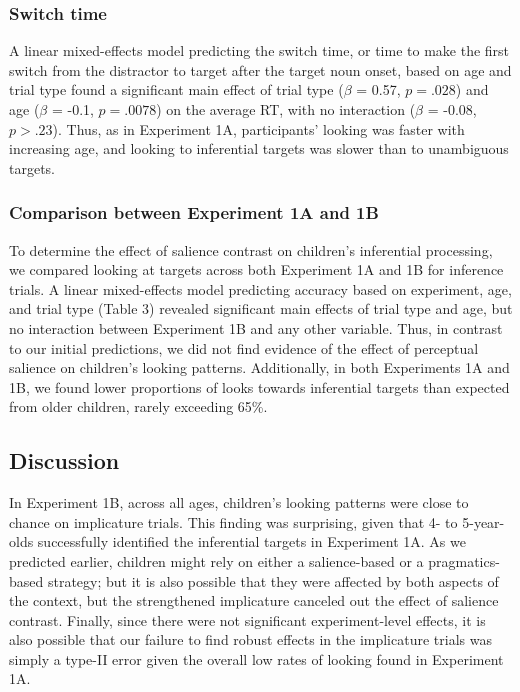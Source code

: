 \documentclass{rsos}
\begin{document}
\subsubsection{Switch time}\label{switch-time-1}

A linear mixed-effects model predicting the switch time, or time to make
the first switch from the distractor to target after the target noun
onset, based on age and trial type found a significant main effect of
trial type (\(\beta\) = 0.57, \(p =.028\)) and age (\(\beta\) = -0.1,
\(p =.0078\)) on the average RT, with no interaction (\(\beta\) = -0.08,
\(p >.23\)). Thus, as in Experiment 1A, participants' looking was faster
with increasing age, and looking to inferential targets was slower than
to unambiguous targets.

\subsubsection{Comparison between Experiment 1A and
1B}\label{comparison-between-experiment-1a-and-1b}

To determine the effect of salience contrast on children's inferential
processing, we compared looking at targets across both Experiment 1A and
1B for inference trials. A linear mixed-effects model predicting
accuracy based on experiment, age, and trial type (Table 3) revealed
significant main effects of trial type and age, but no interaction
between Experiment 1B and any other variable. Thus, in contrast to our
initial predictions, we did not find evidence of the effect of
perceptual salience on children's looking patterns. Additionally, in
both Experiments 1A and 1B, we found lower proportions of looks towards
inferential targets than expected from older children, rarely exceeding
65\%.

\subsection{Discussion}\label{discussion-1}

In Experiment 1B, across all ages, children's looking patterns were
close to chance on implicature trials. This finding was surprising,
given that 4- to 5-year-olds successfully identified the inferential
targets in Experiment 1A. As we predicted earlier, children might rely
on either a salience-based or a pragmatics-based strategy; but it is
also possible that they were affected by both aspects of the context,
but the strengthened implicature canceled out the effect of salience
contrast. Finally, since there were not significant experiment-level
effects, it is also possible that our failure to find robust effects in
the implicature trials was simply a type-II error given the overall low
rates of looking found in Experiment 1A.
\end{document}
